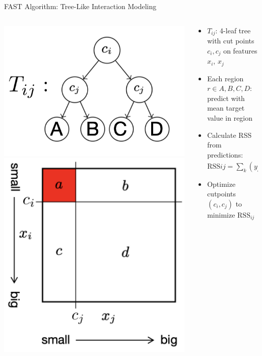 \documentclass[11pt,compress,t,notes=noshow,aspectratio=169,xcolor=table]{beamer}
\begin{document}
\begin{frame}{FAST Algorithm: Tree-Like Interaction Modeling} \begin{columns}[T, totalwidth=\textwidth] \begin{column}{0.5\textwidth} \includegraphics[width=0.6\linewidth]{figure/T_ij.png} \includegraphics[width=0.65\linewidth]{figure/FAST1.png} \end{column} \begin{column}{0.5\textwidth} \begin{itemize} \item $T_{ij}$: 4-leaf tree with cut points $c_i, c_j$ on features $x_i$, $x_j$ \item Each region $r \in {A,B,C,D}$: predict with mean target value in region \item Calculate RSS from predictions: $\text{RSS}{ij} = \sum_k (y_k - T{ij}(x_k))^2$ \item Optimize cutpoints $(c_i, c_j)$ to minimize $\text{RSS}_{ij}$ \end{itemize} \end{column} \end{columns} \end{frame}
\end{document}
